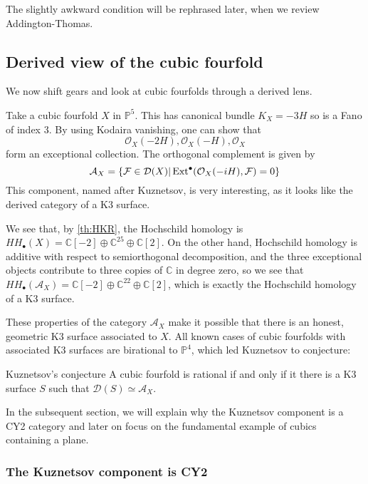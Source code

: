 The slightly awkward condition will be rephrased later, when we review Addington-Thomas.

\subsection{Derived view of the cubic fourfold}

We now shift gears and look at cubic fourfolds through a derived lens.

Take a cubic fourfold $X$ in $\mathbb{P}^5$. This has canonical bundle $K_{X}=-3H$ so is a Fano of index 3. By using Kodaira vanishing, one can show that $$\mathcal{O}_{X}(-2H), \mathcal{O}_{X}(-H), \mathcal{O}_{X}$$form an exceptional collection. The orthogonal complement is given by $$\mathcal{A}_{X}=\{\mathcal{F}\in \mathcal{D}(X)|\,\mathrm{Ext}^\bullet(\mathcal{O}_{X}(-iH), \mathcal{F})=0\}$$This component, named after Kuznetsov, is very interesting, as it looks like the derived category of a K3 surface.

We see that, by \ref{th:HKR}, the Hochschild homology is $HH_\bullet(X)=\mathbb{C}[-2]\oplus \mathbb{C}^{25}\oplus \mathbb{C}[2]$. On the other hand, Hochschild homology is additive with respect to semiorthogonal decomposition, and the three exceptional objects contribute to three copies of $\mathbb{C}$ in degree zero, so we see that $HH_\bullet(\mathcal{A}_X)=\mathbb{C}[-2]\oplus \mathbb{C}^{22}\oplus \mathbb{C}[2]$, which is exactly the Hochschild homology of a K3 surface.

These properties of the category $\mathcal{A}_X$ make it possible that there is an honest, geometric K3 surface associated to $X$. All known cases of cubic fourfolds with associated K3 surfaces are birational to $\mathbb{P}^4$, which led Kuznetsov to conjecture:

\begin{conjecture}{}{Kuznetsov's conjecture}
A cubic fourfold is rational if and only if it there is a K3 surface $S$ such that $\mathcal{D}(S)\simeq \mathcal{A}_X$.
\end{conjecture}

In the subsequent section, we will explain why the Kuznetsov component is a CY2 category and later on focus on the fundamental example of cubics containing a plane.

\subsubsection{The Kuznetsov component is CY2}

